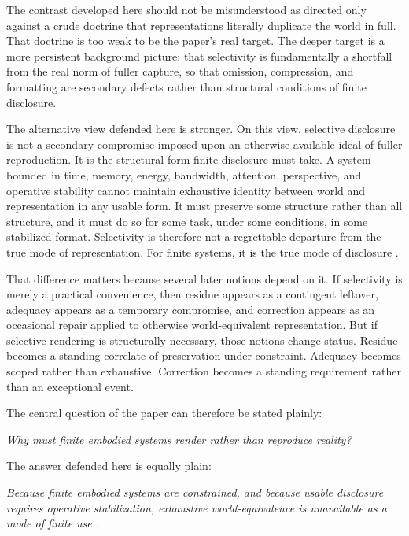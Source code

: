 \documentclass[11pt]{article}
\renewenvironment{quote}
  {\list{}{\leftmargin=1.4em \rightmargin=1.0em}%
   \item\relax\color{softink}\itshape}
  {\endlist}
\begin{document}
The contrast developed here should not be misunderstood as directed only against a crude doctrine that representations literally duplicate the world in full. That doctrine is too weak to be the paper's real target. The deeper target is a more persistent background picture: that selectivity is fundamentally a shortfall from the real norm of fuller capture, so that omission, compression, and formatting are secondary defects rather than structural conditions of finite disclosure.

The alternative view defended here is stronger. On this view, selective disclosure is not a secondary compromise imposed upon an otherwise available ideal of fuller reproduction. It is the structural form finite disclosure must take. A system bounded in time, memory, energy, bandwidth, attention, perspective, and operative stability cannot maintain exhaustive identity between world and representation in any usable form. It must preserve some structure rather than all structure, and it must do so for some task, under some conditions, in some stabilized format. Selectivity is therefore not a regrettable departure from the true mode of representation. For finite systems, it is the true mode of disclosure \cite{FriggNguyen2021ScientificRepresentationSEP,FriggHartmann2025ModelsScienceSEP,Wheeler2024BoundedRationalitySEP}.

That difference matters because several later notions depend on it. If selectivity is merely a practical convenience, then residue appears as a contingent leftover, adequacy appears as a temporary compromise, and correction appears as an occasional repair applied to otherwise world-equivalent representation. But if selective rendering is structurally necessary, those notions change status. Residue becomes a standing correlate of preservation under constraint. Adequacy becomes scoped rather than exhaustive. Correction becomes a standing requirement rather than an exceptional event.

The central question of the paper can therefore be stated plainly:

\begin{quote}
Why must finite embodied systems render rather than reproduce reality?
\end{quote}

The answer defended here is equally plain:

\begin{quote}
Because finite embodied systems are constrained, and because usable disclosure requires operative stabilization, exhaustive world-equivalence is unavailable as a mode of finite use \cite{ConantAshby1970GoodRegulator,Simon1982ModelsBoundedRationality,Ashby1956IntroductionCybernetics}.
\end{quote}
\end{document}
